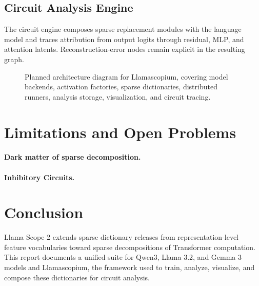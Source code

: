 \documentclass{article}
\begin{document}
\subsection{Circuit Analysis Engine}

The circuit engine composes sparse replacement modules with the language model
and traces attribution from output logits through residual, MLP, and attention
latents. Reconstruction-error nodes remain explicit in the resulting graph.

\begin{figure}[t]
    \centering
    \fbox{\rule{0pt}{1.7in}\rule{0.92\linewidth}{0pt}}
    \caption{Planned architecture diagram for Llamascopium, covering model
    backends, activation factories, sparse dictionaries, distributed runners,
    analysis storage, visualization, and circuit tracing.}
    \label{fig:framework}
\end{figure}



\section{Limitations and Open Problems}
\label{sec:limitations}

\paragraph{Dark matter of sparse decomposition.}

\paragraph{Inhibitory Circuits.}

\paragraph{}



\section{Conclusion}
\label{sec:conclusion}

Llama Scope 2 extends sparse dictionary releases from representation-level
feature vocabularies toward sparse decompositions of Transformer computation.
This report documents a unified suite for Qwen3, Llama 3.2, and Gemma 3 models
and Llamascopium, the framework used to train, analyze, visualize, and compose
these dictionaries for circuit analysis.
\end{document}
